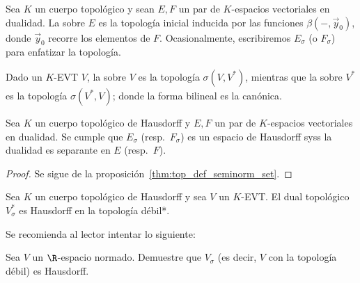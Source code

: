 \documentclass[topologia-analisis.tex]{subfiles}
\begin{document}
\begin{mydefi}
	Sea $K$ un cuerpo topológico y sean $E, F$ un par de $K$-espacios vectoriales en dualidad.
	La  sobre $E$ es la topología inicial inducida por las funciones $\beta(-, \vec y_0)$,
	donde $\vec y_0$ recorre los elementos de $F$.
	Ocasionalmente, escribiremos $E_\sigma$ (o $F_\sigma$) para enfatizar la topología.

	Dado un $K$-EVT $V$, la  sobre $V$ es la topología $\sigma(V, V^*)$,
	mientras que la  sobre $V^*$ es la topología $\sigma(V^*, V)$;
	donde la forma bilineal es la canónica.
\end{mydefi}

\begin{prop}
	Sea $K$ un cuerpo topológico de Hausdorff y $E, F$ un par de $K$-espacios vectoriales en dualidad.
	Se cumple que $E_\sigma$ (resp.\ $F_\sigma$) es un espacio de Hausdorff syss la dualidad es separante en $E$ (resp.\ $F$).
\end{prop}
\begin{proof}
	Se sigue de la proposición~\ref{thm:top_def_seminorm_set}.
\end{proof}
\begin{cor}
	Sea $K$ un cuerpo topológico de Hausdorff y sea $V$ un $K$-EVT.
	El dual topológico $V^*_\sigma$ es Hausdorff en la topología débil*.
\end{cor}

Se recomienda al lector intentar lo siguiente:
\begin{prob}
	Sea $V$ un $\R$-espacio normado.
	Demuestre que $V_\sigma$ (es decir, $V$ con la topología débil) es Hausdorff.
\end{prob}
\end{document}
